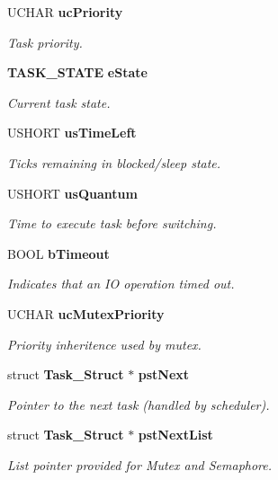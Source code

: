 \begin{DoxyCompactItemize}
UCHAR {\bf ucPriority}
\begin{DoxyCompactList}\small\item\em Task priority. \item\end{DoxyCompactList}\item 
{\bf TASK\_\-STATE} {\bf eState}
\begin{DoxyCompactList}\small\item\em Current task state. \item\end{DoxyCompactList}\item 
USHORT {\bf usTimeLeft}
\begin{DoxyCompactList}\small\item\em Ticks remaining in blocked/sleep state. \item\end{DoxyCompactList}\item 
USHORT {\bf usQuantum}
\begin{DoxyCompactList}\small\item\em Time to execute task before switching. \item\end{DoxyCompactList}\item 
BOOL {\bf bTimeout}
\begin{DoxyCompactList}\small\item\em Indicates that an IO operation timed out. \item\end{DoxyCompactList}\item 
UCHAR {\bf ucMutexPriority}
\begin{DoxyCompactList}\small\item\em Priority inheritence used by mutex. \item\end{DoxyCompactList}\item 
struct {\bf Task\_\-Struct} $\ast$ {\bf pstNext}
\begin{DoxyCompactList}\small\item\em Pointer to the next task (handled by scheduler). \item\end{DoxyCompactList}\item 
struct {\bf Task\_\-Struct} $\ast$ {\bf pstNextList}
\begin{DoxyCompactList}\small\item\em List pointer provided for Mutex and Semaphore. \item\end{DoxyCompactList}\end{DoxyCompactItemize}


